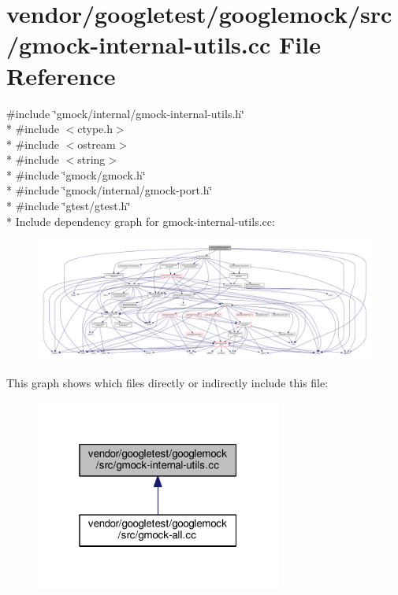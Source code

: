 \hypertarget{gmock-internal-utils_8cc}{}\section{vendor/googletest/googlemock/src/gmock-\/internal-\/utils.cc File Reference}
\label{gmock-internal-utils_8cc}
{\ttfamily \#include \char`\"{}gmock/internal/gmock-\/internal-\/utils.\+h\char`\"{}}\\*
{\ttfamily \#include $<$ctype.\+h$>$}\\*
{\ttfamily \#include $<$ostream$>$}\\*
{\ttfamily \#include $<$string$>$}\\*
{\ttfamily \#include \char`\"{}gmock/gmock.\+h\char`\"{}}\\*
{\ttfamily \#include \char`\"{}gmock/internal/gmock-\/port.\+h\char`\"{}}\\*
{\ttfamily \#include \char`\"{}gtest/gtest.\+h\char`\"{}}\\*
Include dependency graph for gmock-\/internal-\/utils.cc\+:
\nopagebreak
\begin{figure}[H]
\begin{center}
\leavevmode
\includegraphics[width=350pt]{gmock-internal-utils_8cc__incl}
\end{center}
\end{figure}
This graph shows which files directly or indirectly include this file\+:
\nopagebreak
\begin{figure}[H]
\begin{center}
\leavevmode
\includegraphics[width=229pt]{gmock-internal-utils_8cc__dep__incl}
\end{center}
\end{figure}
